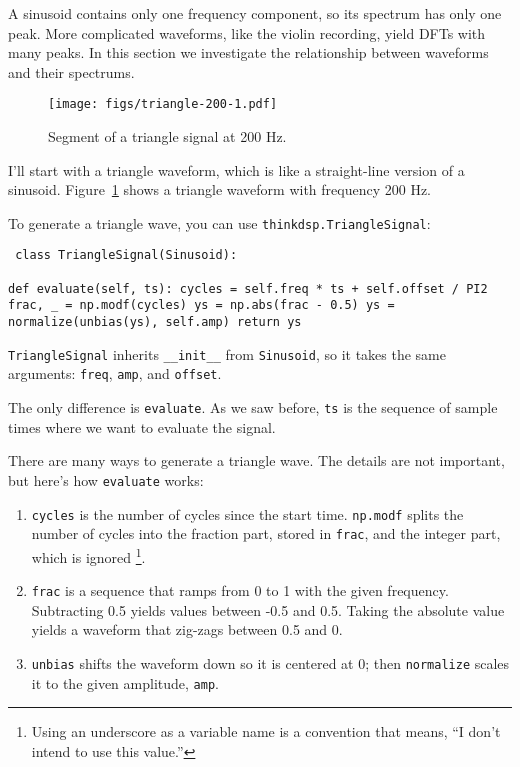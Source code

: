 \documentclass[12pt]{book} \usepackage[width=5.5in,height=8.5in, hmarginratio=3:2,vmarginratio=1:1]{geometry}
\begin{document}
A sinusoid contains only one frequency component, so its spectrum has only one peak. More complicated waveforms, like the violin recording, yield DFTs with many peaks. In this section we investigate the relationship between waveforms and their spectrums. 

\begin{figure} 

\centerline{\texttt{[image: figs/triangle-200-1.pdf]}} \caption{Segment of a triangle signal at 200 Hz.} \label{fig.triangle.200.1} \end{figure} 

I'll start with a triangle waveform, which is like a straight-line version of a sinusoid. Figure~\ref{fig.triangle.200.1} shows a triangle waveform with frequency 200 Hz. 

To generate a triangle wave, you can use {\tt thinkdsp.TriangleSignal}: 

\begin{verbatim} class TriangleSignal(Sinusoid): 

def evaluate(self, ts): cycles = self.freq * ts + self.offset / PI2 frac, _ = np.modf(cycles) ys = np.abs(frac - 0.5) ys = normalize(unbias(ys), self.amp) return ys \end{verbatim} 

{\tt TriangleSignal} inherits \verb"__init__" from {\tt Sinusoid}, so it takes the same arguments: {\tt freq}, {\tt amp}, and {\tt offset}. 

The only difference is {\tt evaluate}. As we saw before, {\tt ts} is the sequence of sample times where we want to evaluate the signal. 

There are many ways to generate a triangle wave. The details are not important, but here's how {\tt evaluate} works: 

\begin{enumerate} 

\item {\tt cycles} is the number of cycles since the start time. {\tt np.modf} splits the number of cycles into the fraction part, stored in {\tt frac}, and the integer part, which is ignored \footnote{Using an underscore as a variable name is a convention that means, ``I don't intend to use this value.''}. 

\item {\tt frac} is a sequence that ramps from 0 to 1 with the given frequency. Subtracting 0.5 yields values between -0.5 and 0.5. Taking the absolute value yields a waveform that zig-zags between 0.5 and 0. 

\item {\tt unbias} shifts the waveform down so it is centered at 0; then {\tt normalize} scales it to the given amplitude, {\tt amp}. 

\end{enumerate} 
\end{document}
